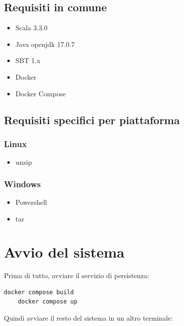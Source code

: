 \documentclass{scrartcl}
\begin{document}
%
%

\subsection{Requisiti in comune}
\begin{itemize}
    \item Scala 3.3.0
    \item Java openjdk 17.0.7
    \item SBT 1.x
    \item Docker
    \item Docker Compose
\end{itemize}

\subsection{Requisiti specifici per piattaforma}
\subsubsection{Linux}
\begin{itemize}
    \item unzip
\end{itemize}

\subsubsection{Windows}
\begin{itemize}
    \item Powershell
    \item tar
\end{itemize}

\section{Avvio del sistema}



Prima di tutto, avviare il servizio di persistenza:

\begin{lstlisting}[language=bash]
    docker compose build
    docker compose up
\end{lstlisting}
Quindi avviare il resto del sistema in un altro terminale:
\end{document}
